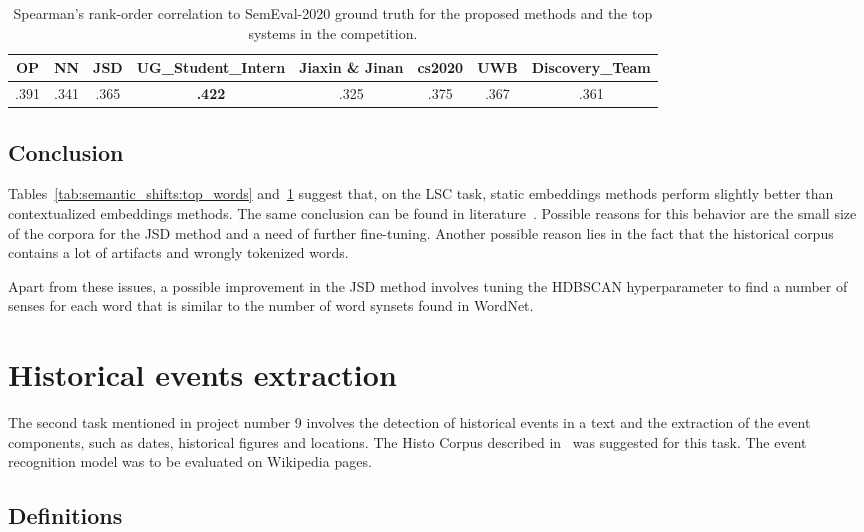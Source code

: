\documentclass[runningheads]{llncs}
\begin{document}
\begin{table}
    \caption{Spearman's rank-order correlation to SemEval-2020 ground truth for the proposed methods and the top systems in the competition.}
    \label{tab:semantic_shifts:spearman}
    \centering
    \begin{tabular}{|c|c|c|c|c|c|c|c|}
        \toprule
        OP & NN & JSD & UG\_Student\_Intern & Jiaxin \& Jinan & cs2020 & UWB & Discovery\_Team \\
        \midrule
        .391 & .341 & .365 & \textbf{.422} & .325 & .375 & .367 & .361 \\
        \bottomrule
    \end{tabular}
\end{table}

\subsection{Conclusion}
\label{subsec:semantic_shifts:conclusion}

Tables~\ref{tab:semantic_shifts:top_words} and~\ref{tab:semantic_shifts:spearman} suggest that, on the LSC task, static embeddings methods perform slightly better than contextualized embeddings methods. The same conclusion can be found in literature~\cite{laicher-etal-2021-explaining,schlechtweg-etal-2020-semeval}. Possible reasons for this behavior are the small size of the corpora for the JSD method and a need of further fine-tuning. Another possible reason lies in the fact that the historical corpus contains a lot of artifacts and wrongly tokenized words.

Apart from these issues, a possible improvement in the JSD method involves tuning the HDBSCAN hyperparameter to find a number of senses for each word that is similar to the number of word synsets found in WordNet.

\section{Historical events extraction}
\label{sec:historical_events}

The second task mentioned in project number 9 involves the detection of historical events in a text and the extraction of the event components, such as dates, historical figures and locations. The Histo Corpus described in~\cite{sprugnoli-tonelli-2019-histo} was suggested for this task. The event recognition model was to be evaluated on Wikipedia pages.

\subsection{Definitions}
\end{document}
